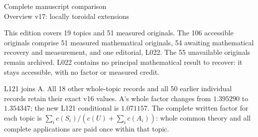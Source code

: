 \documentclass[11pt,a4paper]{article}
\begin{document}
\begin{center}{\Large Complete manuscript comparison}\\[3pt]
Overview v17: locally toroidal extensions\end{center}
This edition covers 19 topics and 51 measured originals. The 106 accessible originals comprise 51 measured mathematical originals, 54 awaiting mathematical recovery and measurement, and one editorial, L022. The 55 unavailable originals remain archived. L022 contains no principal mathematical result to recover: it stays accessible, with no factor or measured credit.

L121 joins A. All 18 other whole-topic records and all 50 earlier individual records retain their exact v16 values. A's whole factor changes from $1.395290$ to $1.354347$; the new L121 conditional is $1.071157$. The complete written factor for each topic is $\sum_i c(S_i)/(c(U)+\sum_i c(A_i))$: whole common theory and all complete applications are paid once within that topic.
\end{document}
